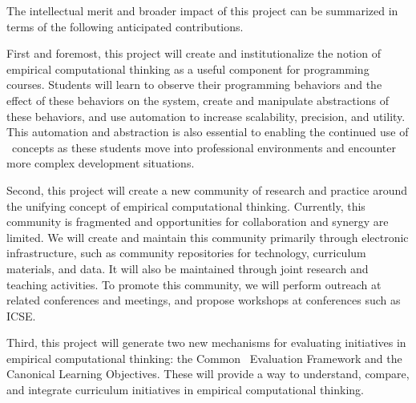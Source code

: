 

The intellectual merit and broader impact of this project can be summarized
in terms of the following anticipated contributions.

First and foremost, this project will create and institutionalize the
notion of empirical computational thinking as a useful component for
programming courses.  Students will learn to observe their programming
behaviors and the effect of these behaviors on the system, create and
manipulate abstractions of these behaviors, and use automation to increase
scalability, precision, and utility.  This automation and abstraction is also
essential to enabling the continued use of \eCT\ concepts as these students
move into professional environments and encounter more complex development
situations.

Second, this project will create a new community of research and practice
around the unifying concept of empirical computational thinking.
Currently, this community is fragmented and opportunities for collaboration
and synergy are limited.  We will create and maintain this community
primarily through electronic infrastructure, such as community repositories
for technology, curriculum materials, and data.  It will also be maintained
through joint research and teaching activities.  To promote this community,
we will perform outreach at related conferences and meetings, and propose
workshops at conferences such as ICSE.

Third, this project will generate two new mechanisms for evaluating
initiatives in empirical computational thinking: the Common \eCT\
Evaluation Framework and the Canonical \eCT Learning Objectives.  These
will provide a way to understand, compare, and integrate curriculum
initiatives in empirical computational thinking.

